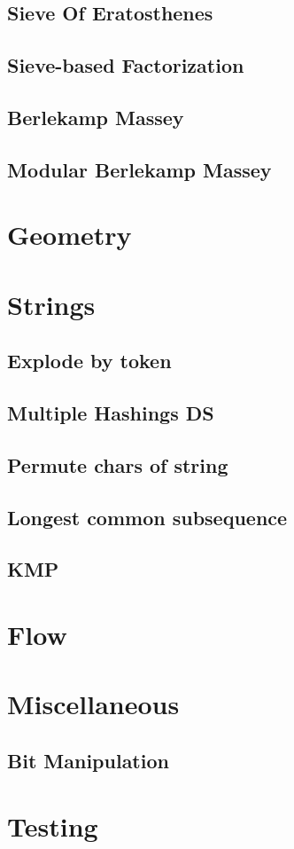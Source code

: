 \subsection{Sieve Of Eratosthenes}
\subsection{Sieve-based Factorization}
\subsection{Berlekamp Massey}
\subsection{Modular Berlekamp Massey}

\section{Geometry}


\section{Strings}
\subsection{Explode by token}
\subsection{Multiple Hashings DS}
\subsection{Permute chars of string}
\subsection{Longest common subsequence}
\subsection{KMP}


\section{Flow}


\section{Miscellaneous}

\subsection{Bit Manipulation}

\section{Testing}





